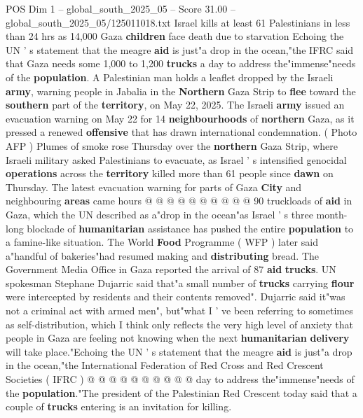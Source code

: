 \begin{textsample}{POS Dim 1 – global\_south\_2025\_05 – Score 31.00 – global\_south\_2025\_05/125011018.txt}  \label{ex:f1_pos_068}
Israel kills at least 61 Palestinians in less than 24 hrs as 14,000 Gaza \textbf{children} face death due to starvation Echoing the UN ' s statement that the meagre \textbf{aid} is just"a drop in the ocean,"the IFRC said that Gaza needs some 1,000 to 1,200 \textbf{trucks} a day to address the"immense"needs of the \textbf{population}.
A Palestinian man holds a leaflet dropped by the Israeli \textbf{army}, warning people in Jabalia in the \textbf{Northern} Gaza Strip to \textbf{flee} toward the \textbf{southern} part of the \textbf{territory}, on May 22, 2025.
The Israeli \textbf{army} issued an evacuation warning on May 22 for 14 \textbf{neighbourhoods} of \textbf{northern} Gaza, as it pressed a renewed \textbf{offensive} that has drawn international condemnation. ( Photo AFP ) Plumes of smoke rose Thursday over the \textbf{northern} Gaza Strip, where Israeli military asked Palestinians to evacuate, as Israel ' s intensified genocidal \textbf{operations} across the \textbf{territory} killed more than 61 people since \textbf{dawn} on Thursday.
The latest evacuation warning for parts of Gaza \textbf{City} and neighbouring \textbf{areas} came hours @ @ @ @ @ @ @ @ @ @ 90 truckloads of \textbf{aid} in Gaza, which the UN described as a"drop in the ocean"as Israel ' s three month-long blockade of \textbf{humanitarian} assistance has pushed the entire \textbf{population} to a famine-like situation.
The World \textbf{Food} Programme ( WFP ) later said a"handful of bakeries"had resumed making and \textbf{distributing} bread.
The Government Media Office in Gaza reported the arrival of 87 \textbf{aid} \textbf{trucks}.
UN spokesman Stephane Dujarric said that"a small number of \textbf{trucks} carrying \textbf{flour} were intercepted by residents and their contents removed".
Dujarric said it"was not a criminal act with armed men", but"what I ' ve been referring to sometimes as self-distribution, which I think only reflects the very high level of anxiety that people in Gaza are feeling not knowing when the next \textbf{humanitarian} \textbf{delivery} will take place."Echoing the UN ' s statement that the meagre \textbf{aid} is just"a drop in the ocean,"the International Federation of Red Cross and Red Crescent Societies ( IFRC ) @ @ @ @ @ @ @ @ @ @ day to address the"immense"needs of the \textbf{population}."The president of the Palestinian Red Crescent today said that a couple of \textbf{trucks} entering is an invitation for killing.

\end{textsample}
